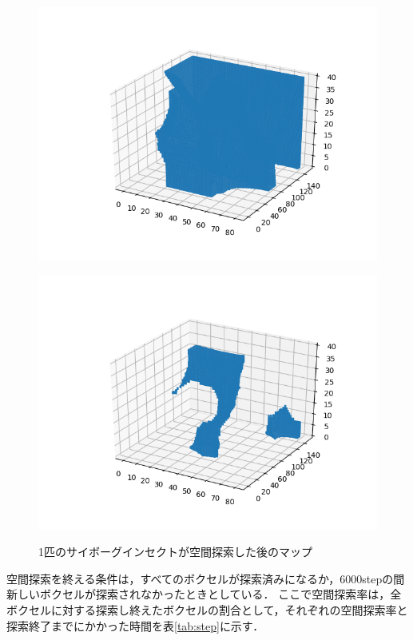 \documentclass[a4paper,11pt]{jarticle}
\begin{document}
\begin{figure}
\begin{minipage}{0.5\linewidth}
			\centering
			\includegraphics[width=1\linewidth]{png/Figure1_4_41000.png}
			\label{fig:1-3}
		\end{minipage}
		\begin{minipage}{0.5\linewidth}
			\centering
			\includegraphics[width=1\linewidth]{png/Figure1_height_60000.png}
			\label{fig:1-4}
		\end{minipage}
		\caption{1匹のサイボーグインセクトが空間探索した後のマップ}
		\label{fig:1_finish}
	\end{figure}
	
	空間探索を終える条件は，すべてのボクセルが探索済みになるか，6000stepの間新しいボクセルが探索されなかったときとしている．
	ここで空間探索率は，全ボクセルに対する探索し終えたボクセルの割合として，それぞれの空間探索率と探索終了までにかかった時間を表\ref{tab:step}に示す．
	
\end{document}
